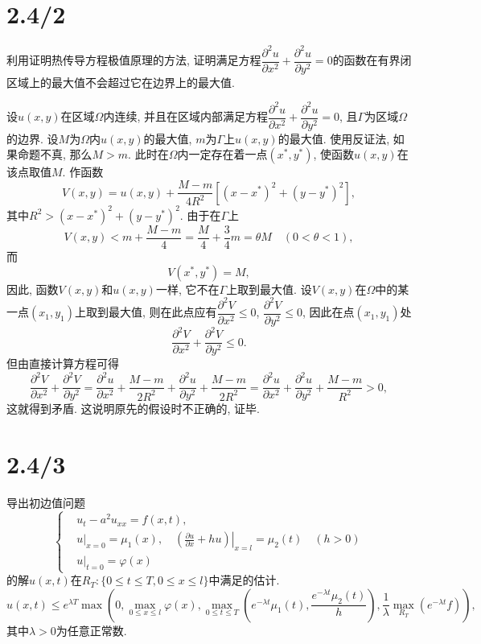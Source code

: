 \documentclass[11pt,a4paper]{article}
\begin{document}
\section{2.4/2}
\begin{problem}
利用证明热传导方程极值原理的方法, 证明满足方程$\dfrac{\partial^2u}{\partial x^2}+\dfrac{\partial^2u}{\partial y^2}=0$的函数在有界闭区域上的最大值不会超过它在边界上的最大值.
\end{problem}

设$u(x,y)$在区域$\Omega$内连续, 并且在区域内部满足方程$\dfrac{\partial^2u}{\partial x^2}+\dfrac{\partial^2u}{\partial y^2}=0$, 且$\Gamma$为区域$\Omega$的边界. 设$M$为$\Omega$内$u(x,y)$的最大值, $m$为$\Gamma$上$u(x,y)$的最大值. 使用反证法, 如果命题不真, 那么$M>m$. 此时在$\Omega$内一定存在着一点$(x^*,y^*)$, 使函数$u(x,y)$在该点取值$M$. 作函数
$$V(x,y)=u(x,y)+\frac{M-m}{4R^2}[(x-x^*)^2+(y-y^*)^2],$$
其中$R^2>(x-x^*)^2+(y-y^*)^2$. 由于在$\Gamma$上
$$V(x,y)<m+\frac{M-m}{4}=\frac{M}{4}+\frac{3}{4}m=\theta M\quad (0<\theta<1),$$
而$$V(x^*,y^*)=M,$$
因此, 函数$V(x,y)$和$u(x,y)$一样, 它不在$\Gamma$上取到最大值. 设$V(x,y)$在$\Omega$中的某一点$(x_1,y_1)$上取到最大值, 则在此点应有$\dfrac{\partial^2 V}{\partial x^2}\leqslant0$, $\dfrac{\partial^2 V}{\partial y^2}\leqslant0$, 因此在点$(x_1,y_1)$处
$$\frac{\partial^2 V}{\partial x^2}+\frac{\partial^2 V}{\partial y^2}\leqslant 0.$$
但由直接计算方程可得
$$\frac{\partial^2 V}{\partial x^2}+\frac{\partial^2 V}{\partial y^2}=\frac{\partial^2 u}{\partial x^2}+\frac{M-m}{2R^2}+\frac{\partial^2 u}{\partial y^2}+\frac{M-m}{2R^2}=\frac{\partial^2 u}{\partial x^2}+\frac{\partial^2 u}{\partial y^2}+\frac{M-m}{R^2}>0,$$
这就得到矛盾. 这说明原先的假设时不正确的, 证毕.

\section{2.4/3}
\begin{problem}
导出初边值问题
$$\left\{\begin{aligned}
     & u_t-a^2u_{xx}=f(x,t),                                                                                        \\
     & u|_{x=0}=\mu_1(x),\quad \left.\left(\frac{\partial u}{\partial x}+hu\right)\right|_{x=l}=\mu_2(t)\quad (h>0) \\
     & u|_{t=0}=\varphi(x)
  \end{aligned}\right.$$
的解$u(x,t)$在$R_T:\{0\leqslant t\leqslant T,0\leqslant x\leqslant l\}$中满足的估计.
$$u(x,t)\leqslant e^{\lambda T}\max\left(0,\max_{0\leqslant x\leqslant l}\varphi(x),\max_{0\leqslant t\leqslant T}\left(e^{-\lambda t}\mu_1(t),\frac{e^{-\lambda t}\mu_2(t)}{h}\right),\frac{1}{\lambda}\max_{R_T}(e^{-\lambda t}f)\right),$$
其中$\lambda>0$为任意正常数.
\end{problem}
\end{document}
